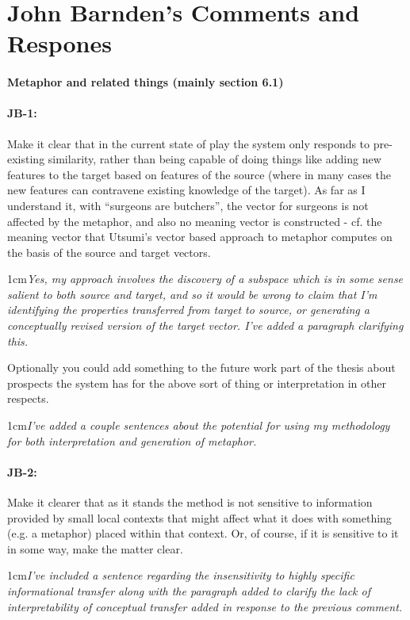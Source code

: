 \documentclass[11pt,a4paper]{article}
\newcommand{\res}[1]{\vspace{0.25cm} \begin{adjustwidth}{1cm}{}\emph{#1}\end{adjustwidth}}
\begin{document}
\section{John Barnden's Comments and Respones}

\paragraph{Metaphor and related things  (mainly section 6.1)}

\paragraph{JB-1:} Make it clear that in the current state of play the system only responds to pre-existing similarity, rather than being capable of doing things like adding new features to the target based on features of the source (where in many cases the new features can contravene existing knowledge of the target).  As far as I understand it, with ``surgeons are butchers'', the vector for surgeons is not affected by the metaphor, and also no meaning vector is constructed - cf. the meaning vector that Utsumi's vector based approach to metaphor computes on the basis of the source and target vectors.

\res{Yes, my approach involves the discovery of a subspace which is in some sense salient to both source and target, and so it would be wrong to claim that I'm identifying the properties transferred from target to source, or generating a conceptually revised version of the target vector.  I've added a paragraph clarifying this.}

Optionally you could add something to the future work part of the thesis about prospects the system has for the above sort of thing or interpretation in other respects.

\res{I've added a couple sentences about the potential for using my methodology for both interpretation and generation of metaphor.}

\paragraph{JB-2:} Make it clearer that as it stands the method is not sensitive to information provided by small local contexts that might affect what it does with something (e.g. a metaphor) placed within that context. Or, of course, if it is sensitive to it in some way, make the matter clear.

\res{I've included a sentence regarding the insensitivity to highly specific informational transfer along with the paragraph added to clarify the lack of interpretability of conceptual transfer added in response to the previous comment.}
\end{document}
